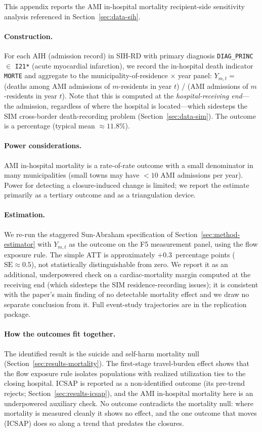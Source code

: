 This appendix reports the AMI in-hospital mortality recipient-side
sensitivity analysis referenced in Section~\ref{sec:data-sih}.

\paragraph{Construction.} For each AIH (admission record) in SIH-RD
with primary diagnosis \texttt{DIAG\_PRINC} $\in$ \texttt{I21*} (acute
myocardial infarction), we record the in-hospital death indicator
\texttt{MORTE} and aggregate to the municipality-of-residence × year
panel: $Y_{m, t} = $ (deaths among AMI admissions of $m$-residents
in year $t$) / (AMI admissions of $m$-residents in year $t$). Note
that this is computed at the \emph{hospital-receiving end}---the
admission, regardless of where the hospital is located---which
sidesteps the SIM cross-border death-recording problem (Section~\ref{sec:data-sim}).
The outcome is a percentage (typical mean $\approx 11.8\%$).

\paragraph{Power considerations.} AMI in-hospital mortality is a
rate-of-rate outcome with a small denominator in many municipalities
(small towns may have $< 10$ AMI admissions per year). Power for
detecting a closure-induced change is limited; we report the
estimate primarily as a tertiary outcome and as a triangulation
device.

\paragraph{Estimation.} We re-run the staggered Sun-Abraham specification
of Section~\ref{sec:method-estimator} with $Y_{m, t}$ as the outcome on the
F5 measurement panel, using the flow exposure rule. The simple ATT is
approximately $+0.3$~percentage points ($\mathrm{SE} \approx 0.5$), not
statistically distinguishable from zero. We report it as an additional,
underpowered check on a cardiac-mortality margin computed at the
receiving end (which sidesteps the SIM residence-recording issues); it
is consistent with the paper's main finding of no detectable mortality
effect and we draw no separate conclusion from it. Full event-study
trajectories are in the replication package.

\paragraph{How the outcomes fit together.} The identified result is the
suicide and self-harm mortality null (Section~\ref{sec:results-mortality}).
The first-stage travel-burden effect shows that the flow exposure rule
isolates populations with realized utilization ties to the closing
hospital. ICSAP is reported as a
non-identified outcome (its pre-trend rejects;
Section~\ref{sec:results-icsap}), and the AMI in-hospital mortality here
is an underpowered auxiliary check. No outcome contradicts the mortality
null: where mortality is measured cleanly it shows no effect, and the
one outcome that moves (ICSAP) does so along a trend that predates the
closures.

